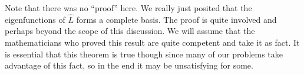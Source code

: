 Note that there was no ``proof'' here.
We really just posited that the eigenfunctions of $\hat{L}$ forms a complete basis.
The proof is quite involved and perhaps beyond the scope of this discussion.
We will assume that the mathematicians who proved this result are quite competent and take it as fact.
It is essential that this theorem is true though since many of our problems take advantage of this fact, so in the end it may be unsatisfying for some.







